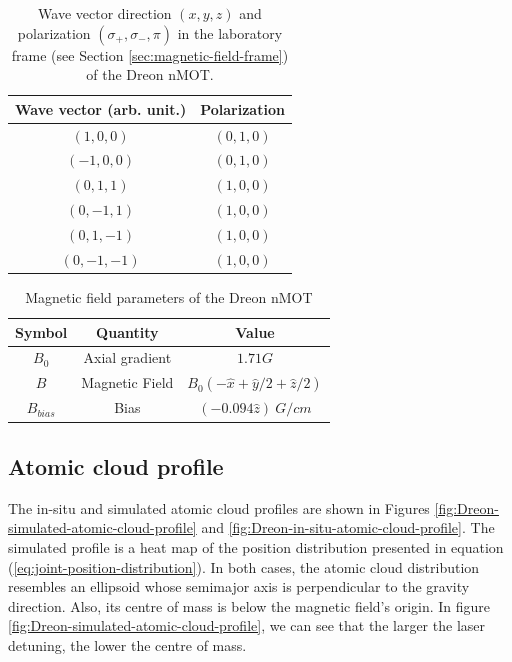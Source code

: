 \begin{table}[ht!]
    \centering
    \begin{tabular}{|c|c|}
        \hline
        \textbf{Wave vector (arb. unit.)} & \textbf{Polarization} \\ \hline
        $ (1, 0, 0) $ & $ (0, 1, 0) $ \\
        $ (-1, 0, 0) $ & $ (0, 1, 0) $ \\
        $ (0, 1, 1) $ & $ (1, 0, 0) $ \\
        $ (0, -1, 1) $ & $ (1, 0, 0) $ \\
        $ (0, 1, -1) $ & $ (1, 0, 0) $ \\
        $ (0, -1, -1) $ & $ (1, 0, 0) $ \\
        \hline
    \end{tabular}
    \caption{Wave vector direction $ (x, y, z) $ and polarization $ (\sigma_+, \sigma_-, \pi) $ in the laboratory frame (see Section \ref{sec:magnetic-field-frame}) of the Dreon nMOT.}
    \label{tab:Dreon-laser-beams}
\end{table}

\begin{table}[ht!]
    \centering
    \begin{tabular}{|c|c|c|}
        \hline
        \textbf{Symbol} & \textbf{Quantity} & \textbf{Value} \\ \hline
        $ B_0 $ & Axial gradient & $ 1.71 G $ \\
        $ B $ & Magnetic Field & $ B_0(-\hat{x} + \hat{y}/2 + \hat{z} / 2) $ \\
        $ B_{bias} $ & Bias & $ (-0.094 \hat{z})\ G / cm $ \\
        \hline
    \end{tabular}
    \caption{Magnetic field parameters of the Dreon nMOT}
    \label{tab:Dreon-magnetic-field}
\end{table}

\subsection{Atomic cloud profile}
\label{sec:cloud-profile-dysprosium}

The in-situ and simulated atomic cloud profiles are shown in Figures \ref{fig:Dreon-simulated-atomic-cloud-profile} and \ref{fig:Dreon-in-situ-atomic-cloud-profile}. The simulated profile is a heat map of the position distribution presented in equation (\ref{eq:joint-position-distribution}). In both cases, the atomic cloud distribution resembles an ellipsoid whose semimajor axis is perpendicular to the gravity direction. Also, its centre of mass is below the magnetic field's origin. In figure \ref{fig:Dreon-simulated-atomic-cloud-profile}, we can see that the larger the laser detuning, the lower the centre of mass.

